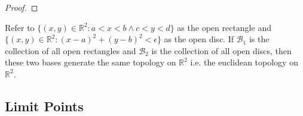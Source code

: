 \begin{proof}

\end{proof}

\begin{example}
    Refer to $\{(x,y) \in \mathbb{R}^{2}: a<x<b \land
    c<y<d\}$ as the open rectangle and $\{(x,y) \in \mathbb{R}^{2}:
    (x-a)^2 + (y-b)^2 < \epsilon\}$ as the open disc. If
    $\mathcal{B}_{1}$ is the collection of all open rectangles and
    $\mathcal{B}_{2}$ is the collection of all open discs, then these
    two bases generate the same topology on $\mathbb{R}^2$ i.e. the
    euclidean topology on $\mathbb{R}^2$.
\end{example}
\subsection{Limit Points}\label{sub:Limit Points} %

